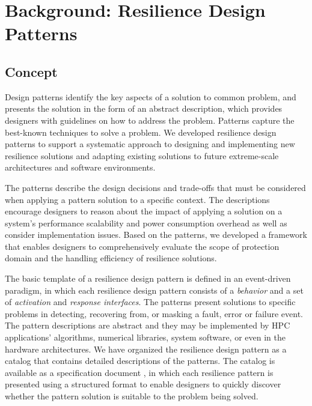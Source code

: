\section{Background: Resilience Design Patterns}
\label{sec:Background}

\subsection{Concept}
Design patterns identify the key aspects of a solution to common problem, and presents the solution in the form of an abstract description, which provides designers with guidelines on how to address the problem. Patterns capture the best-known techniques to solve a problem. We developed resilience design patterns \cite{Hukerikar:2017} to support a systematic approach to designing and implementing new resilience solutions and adapting existing solutions to future extreme-scale architectures and software environments. 

The patterns describe the design decisions and trade-offs that must be considered when applying a pattern solution to a specific context. The descriptions encourage designers to reason about the impact of applying a solution on a system's performance scalability and power consumption overhead as well as consider implementation issues. Based on the patterns, we developed a framework that enables designers to comprehensively evaluate the scope of protection domain and the handling efficiency of resilience solutions.

The basic template of a resilience design pattern is defined in an event-driven paradigm, in which each resilience design pattern consists of a {\em behavior} and a set of {\em activation} and {\em response interfaces}. The patterns present solutions to specific problems in detecting, recovering from, or masking a fault, error or failure event. The pattern descriptions are abstract and they may be implemented by HPC applications' algorithms, numerical libraries, system software, or even in the hardware architectures. We have organized the resilience design pattern as a catalog that contains detailed descriptions of the patterns. The catalog is available as a specification document \cite{RDP:Spec}, in which each resilience pattern is presented using a structured format to enable designers to quickly discover whether the pattern solution is suitable to the problem being solved. 

